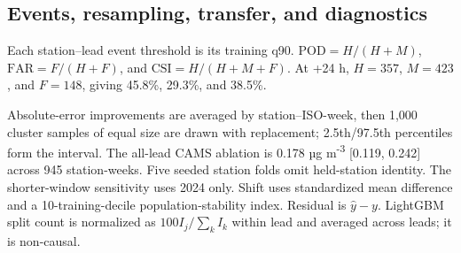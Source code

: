 \documentclass[11pt,a4paper]{article}
\begin{document}
\subsection{Events, resampling, transfer, and diagnostics}
Each station--lead event threshold is its training q90. $\mathrm{POD}=H/(H+M)$, $\mathrm{FAR}=F/(H+F)$, and $\mathrm{CSI}=H/(H+M+F)$. At +24 h, $H=357$, $M=423$, and $F=148$, giving 45.8\%, 29.3\%, and 38.5\%.

Absolute-error improvements are averaged by station--ISO-week, then 1,000 cluster samples of equal size are drawn with replacement; 2.5th/97.5th percentiles form the interval. The all-lead CAMS ablation is 0.178 µg m\textsuperscript{-3} [0.119, 0.242] across 945 station-weeks. Five seeded station folds omit held-station identity. The shorter-window sensitivity uses 2024 only. Shift uses standardized mean difference and a 10-training-decile population-stability index. Residual is $\hat y-y$. LightGBM split count is normalized as $100I_j/\sum_kI_k$ within lead and averaged across leads; it is non-causal.
\end{document}

